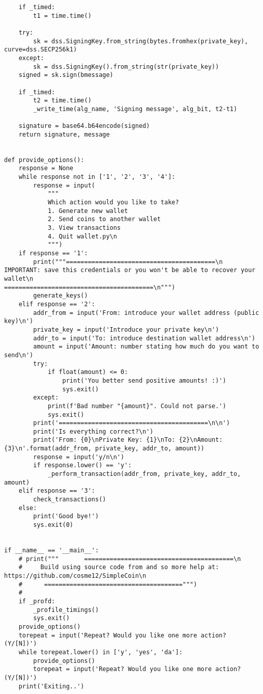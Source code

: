 \begin{lstlisting}
    if _timed:
        t1 = time.time()

    try:
        sk = dss.SigningKey.from_string(bytes.fromhex(private_key), curve=dss.SECP256k1)
    except:
        sk = dss.SigningKey().from_string(str(private_key))
    signed = sk.sign(bmessage)

    if _timed:
        t2 = time.time()
        _write_time(alg_name, 'Signing message', alg_bit, t2-t1)

    signature = base64.b64encode(signed)
    return signature, message


def provide_options():
    response = None
    while response not in ['1', '2', '3', '4']:
        response = input(
            """
            Which action would you like to take?
            1. Generate new wallet
            2. Send coins to another wallet
            3. View transactions
            4. Quit wallet.py\n
            """)
    if response == '1':
        print("""=========================================\n
IMPORTANT: save this credentials or you won't be able to recover your wallet\n
=========================================\n""")
        generate_keys()
    elif response == '2':
        addr_from = input('From: introduce your wallet address (public key)\n')
        private_key = input('Introduce your private key\n')
        addr_to = input('To: introduce destination wallet address\n')
        amount = input('Amount: number stating how much do you want to send\n')
        try:
            if float(amount) <= 0:
                print('You better send positive amounts! :)')
                sys.exit()
        except:
            print(f'Bad number "{amount}". Could not parse.')
            sys.exit()
        print('=========================================\n\n')
        print('Is everything correct?\n')
        print('From: {0}\nPrivate Key: {1}\nTo: {2}\nAmount: {3}\n'.format(addr_from, private_key, addr_to, amount))
        response = input('y/n\n')
        if response.lower() == 'y':
            _perform_transaction(addr_from, private_key, addr_to, amount)
    elif response == '3':
        check_transactions()
    else:
        print('Good bye!')
        sys.exit(0)


if __name__ == '__main__':
    # print("""       =========================================\n
    #     Build using source code from and so more help at: https://github.com/cosme12/SimpleCoin\n
    #      ======================================""")
    #
    if _profd:
        _profile_timings()
        sys.exit()
    provide_options()
    torepeat = input('Repeat? Would you like one more action? (Y/[N])')
    while torepeat.lower() in ['y', 'yes', 'da']:
        provide_options()
        torepeat = input('Repeat? Would you like one more action? (Y/[N])')
    print('Exiting..')


\end{lstlisting}

